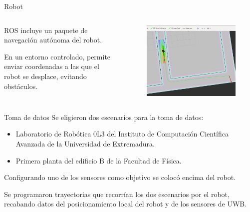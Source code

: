 \documentclass{beamer}
\begin{document}
  \begin{frame}{Robot}
    \begin{columns}
      \begin{column}{0.5\textwidth}
        ROS incluye un paquete de navegación autónoma del robot.

        \vspace{0.5cm}
        En un entorno controlado, permite enviar coordenadas a las que el robot se desplace, evitando obstáculos.
      \end{column}
      \begin{column}{0.5\textwidth}
        \begin{figure}[H]
          \centering
          \includegraphics[width=\textwidth]{pic/Trayectoria.png}
          \label{fig:robot}
      \end{figure}
      \end{column}
    \end{columns}
  \end{frame}

  \begin{frame}{Toma de datos}
    Se eligieron dos escenarios para la toma de datos:
    \begin{itemize}
      \item Laboratorio de Robótica 0L3 del Instituto de Computación Científica Avanzada de la Universidad de Extremadura.
      \item Primera planta del edificio B de la Facultad de Física.
    \end{itemize}

    \vspace{0.5cm}
    Configurando uno de los sensores como objetivo se colocó encima del robot.

    \vspace{0.5cm}
    Se programaron trayectorias que recorrían los dos escenarios por el robot, recabando datos del posicionamiento local del robot y de los sensores de UWB.
  \end{frame}
\end{document}
